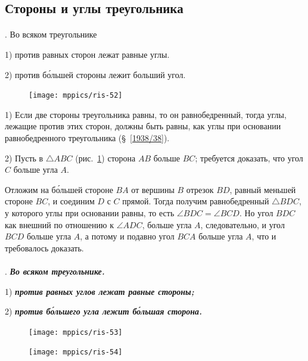 \documentclass[twoside]{book}
\begin{document}
\subsection*{Стороны и углы треугольника}

\paragraph{}\label{1938/46}
.
Во всяком треугольнике

1) против равных сторон лежат равные углы.

2) против б\'{о}льшей стороны лежит больший угол.

\begin{figure}
\centering
\texttt{[image: mppics/ris-52]}
\caption{}\label{1938/ris-52}
\end{figure}

1) Если две стороны треугольника равны, то он равнобедренный, тогда углы, лежащие против этих сторон, должны быть равны, как углы при основании равнобедренного треугольника (§~\ref{1938/38}).

2) Пусть в $\triangle ABC$ (рис.~\ref{1938/ris-52}) сторона $AB$ больше $BC$;
требуется доказать, что угол $C$ больше угла $A$.

Отложим на б\'{о}льшей стороне $BA$ от вершины $B$ отрезок $BD$, равный меньшей стороне $BC$, и соединим $D$ с $C$ прямой.
Тогда получим равнобедренный $\triangle BDC$, у которого углы при основании равны, то есть $\angle BDC=\angle BCD$.
Но угол $BDC$ как внешний по отношению к $\angle ADC$, больше угла $A$, следовательно, и угол $BCD$ больше угла $A$, а потому и подавно угол $BCA$ больше угла $A$, что и требовалось доказать.

\paragraph{}\label{1938/47}
\mbox{.}
\textbf{\emph{Во всяком треугольнике.}}

1) \textbf{\emph{против равных углов лежат равные стороны;}}

2) \textbf{\emph{против б\'{о}льшего угла лежит б\'{о}льшая сторона.}}

\begin{figure}
\centering
\texttt{[image: mppics/ris-53]}
\caption{}\label{1938/ris-53}
\bigskip
\texttt{[image: mppics/ris-54]}
\caption{}\label{1938/ris-54}
\end{figure}
\end{document}

